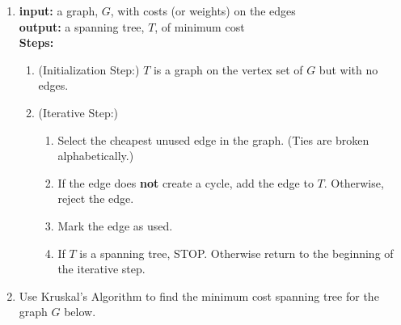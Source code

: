 \documentclass[12pt]{article}
\renewcommand{\emph}[1]{\textsf{\textbf{#1}}}
\begin{document}
\begin{enumerate}
\newpage
\item
{}

\emph{input:} a graph, $G$, with costs (or weights) on the edges\\
\emph{output:} a spanning tree, $T$, of minimum cost\\
\emph{Steps:}
\begin{enumerate}
	\item (Initialization Step:) $T$ is a graph on the vertex set of $G$ but with no edges.
	\item (Iterative Step:) 
		\begin{enumerate}
		\item Select the cheapest unused edge in the graph. (Ties are broken alphabetically.)
		\item If the edge does \emph{not} create a cycle, add the edge to $T$. Otherwise, reject the edge.
		\item Mark the edge as used.
		\item If $T$ is a spanning tree, STOP. Otherwise return to the beginning of the iterative step.
		\end{enumerate}
\end{enumerate}

\item Use Kruskal's Algorithm to find the minimum cost spanning tree for the graph $G$ below.


\end{enumerate}
\end{document}
